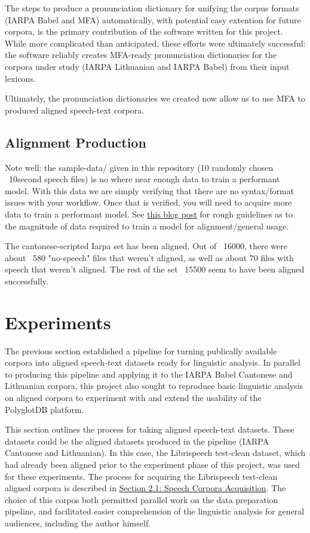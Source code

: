\documentclass[11pt]{article}
\begin{document}
The steps to produce a pronunciation dictionary for unifying the corpus formats (IARPA Babel and MFA) automatically, with potential easy extention for future corpora, is the primary contribution of the software written for this project. While more complicated than anticipated, these efforts were ultimately successful: the software reliably creates MFA-ready pronunciation dictionaries for the corpora under study (IARPA Lithuanian and IARPA Babel) from their input lexicons. 

Ultimately, the pronunciation dictionaries  we created now allow us to use MFA to produced aligned speech-text corpora.

\subsection{Alignment Production}

Note well: the sample-data/ given in this repository (10 randomly chosen ~10second speech files) is no where near enough data to train a performant model. With this data we are simply verifying that there are no syntax/format issues with your workflow. Once that is verified, you will need to acquire more data to train a performant model. See \href{https://memcauliffe.com/how-much-data-do-you-need-for-a-good-mfa-alignment.html}{this blog post} for rough guidelines as to the magnitude of data required to train a model for alignment/general usage.

The cantonese-scripted Iarpa set has been aligned. Out of ~16000, there were about ~580 "no-speech" files that weren't aligned, as well as about 70 files with speech that weren't aligned. The rest of the set ~15500 seem to have been aligned successfully.

\section{Experiments}

The previous section established a pipeline for turning publically available corpora into aligned speech-text datasets ready for linguistic analysis. In parallel to producing this pipeline and applying it to the IARPA Babel Cantonese and Lithuanian corpora, this project also sought to reproduce basic linguistic analysis on aligned corpora to experiment with and extend the usability of the PolyglotDB platform.

This section outlines the process for taking aligned speech-text datasets. These datasets could be the aligned datasets produced in the pipeline (IARPA Cantonese and Lithuanian). In this case, the Librispeech test-clean dataset, which had already been aligned prior to the experiment phase of this project, was used for these experiments. The process for acquiring the Librispeech test-clean aligned corpora is described in \hyperlink{section.21}{Section 2.1: Speech Corpora Acquisition}. The choice of this corpos both permitted parallel work on the data preparation pipeline, and facilitated easier comprehension of the linguistic analysis for general audiences, including the author himself.
\end{document}
